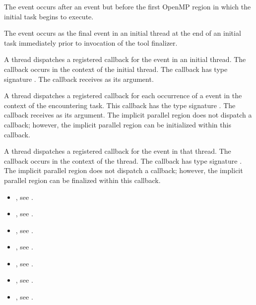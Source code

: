 The  event occurs after an  event
but before the first OpenMP region in which the initial task begins to execute.

The  event occurs as the final event in an initial thread 
at the end of an initial task immediately prior to invocation of the tool finalizer.

\tools

A thread dispatches a registered 
callback for the  event in an initial thread.
The callback occurs in the context of the initial thread.
The callback has type signature .
The callback receives  as its  argument.

A thread dispatches a registered 
callback for each occurrence of a  event
in the context of the encountering task.  This callback has the type signature
. The callback receives  
as its  argument. The implicit parallel region does not dispatch a 
 callback; however, the implicit parallel 
region can be initialized within this  callback.

A thread dispatches a registered 
callback for the  event in that thread.
The callback occurs in the context of the thread.  The callback has type signature
. The implicit parallel region does not dispatch 
a  callback; however, the implicit parallel region 
can be finalized within this  callback.

\crossreferences
\begin{itemize}
\item {}, see .

\item {}, see .

\item {},
see .

\item {},
see .

\item {},
see .

\item {},
see .

\item {},
see .
\end{itemize}



